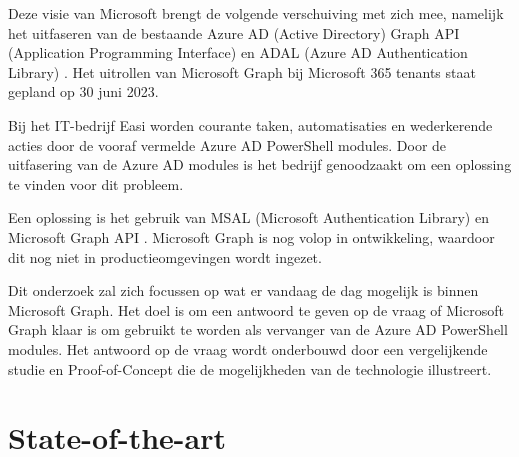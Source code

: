 Deze visie van Microsoft brengt de volgende verschuiving met zich mee, namelijk het uitfaseren van de bestaande Azure AD (Active Directory) Graph API (Application Programming Interface) en ADAL (Azure AD Authentication Library) \autocite{Sahay2022}. Het uitrollen van Microsoft Graph bij Microsoft 365 tenants staat gepland op 30 juni 2023.

Bij het IT-bedrijf Easi worden courante taken, automatisaties en wederkerende acties door de vooraf vermelde Azure AD PowerShell modules. Door de uitfasering van de Azure AD modules is het bedrijf genoodzaakt om een oplossing te vinden voor dit probleem.

Een oplossing is het gebruik van MSAL (Microsoft Authentication Library) en Microsoft Graph API \autocite{Microsoft2023Va}. Microsoft Graph is nog volop in ontwikkeling, waardoor dit nog niet in productieomgevingen wordt ingezet.

Dit onderzoek zal zich focussen op wat er vandaag de dag mogelijk is binnen Microsoft Graph. Het doel is om een antwoord te geven op de vraag of Microsoft Graph klaar is om gebruikt te worden als vervanger van de Azure AD PowerShell modules. Het antwoord op de vraag wordt onderbouwd door een vergelijkende studie en Proof-of-Concept die de mogelijkheden van de technologie illustreert.



\section{State-of-the-art}%
\label{sec:state-of-the-art}

